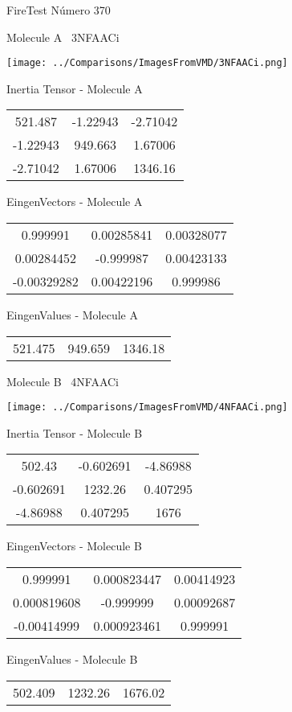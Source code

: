 \vtab[-3cm]
\begin{center}
{\large FireTest \tab Número 370}
\end{center}
\begin{multicols}{2}
\begin{center}

Molecule A \
3NFAACi

\texttt{[image: ../Comparisons/ImagesFromVMD/3NFAACi.png]}

Inertia Tensor - Molecule A \\
\begin{tabular}{|c c c|}
521.487	 & 	-1.22943	 & 	-2.71042	 \\
-1.22943	 & 	949.663	 & 	1.67006	 \\
-2.71042	 & 	1.67006	 & 	1346.16
\end{tabular}

\vtab
 EingenVectors - Molecule A     \\
\begin{tabular}{|c c c|}
0.999991	 & 	0.00285841	 & 	0.00328077	 \\
0.00284452	 & 	-0.999987	 & 	0.00423133	 \\
-0.00329282	 & 	0.00422196	 & 	0.999986
\end{tabular}

\vtab
 EingenValues - Molecule A     \\
\begin{tabular}{|c c c|}
521.475	 & 	949.659	 & 	1346.18	 \\
\end{tabular}
\columnbreak

Molecule B \
4NFAACi

\texttt{[image: ../Comparisons/ImagesFromVMD/4NFAACi.png]}

Inertia Tensor - Molecule B \\
\begin{tabular}{|c c c|}
502.43	 & 	-0.602691	 & 	-4.86988	 \\
-0.602691	 & 	1232.26	 & 	0.407295	 \\
-4.86988	 & 	0.407295	 & 	1676
\end{tabular}

\vtab
 EingenVectors - Molecule B     \\
\begin{tabular}{|c c c|}
0.999991	 & 	0.000823447	 & 	0.00414923	 \\
0.000819608	 & 	-0.999999	 & 	0.00092687	 \\
-0.00414999	 & 	0.000923461	 & 	0.999991
\end{tabular}

\vtab
 EingenValues - Molecule B     \\
\begin{tabular}{|c c c|}
502.409	 & 	1232.26	 & 	1676.02	 \\
\end{tabular}

\end{center}
\end{multicols}


